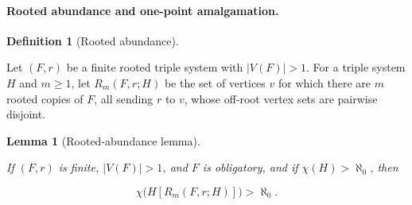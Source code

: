 \documentclass[a4paper,11pt,reqno]{amsart}
\theoremstyle{plain}
\newtheorem{lemma}[theorem]{Lemma}
\theoremstyle{definition}
\newtheorem{definition}[theorem]{Definition}
\theoremstyle{remark}
\begin{document}
\paragraph{Rooted abundance and one-point amalgamation.}\label{rooted-abundance-and-one-point-amalgamation}

\begin{definition}[Rooted abundance]\label{definition-4.2-rooted-abundance}

Let \((F,r)\) be a finite rooted triple system with \(|V(F)|>1\). For a triple system \(H\) and \(m\ge1\), let \(R_m(F,r;H)\) be the set of vertices \(v\) for which there are \(m\) rooted copies of \(F\), all sending \(r\) to \(v\), whose off-root vertex sets are pairwise disjoint.

\end{definition}
\begin{lemma}[Rooted-abundance lemma]\label{lemma-4.3-rooted-abundance-lemma}

If \((F,r)\) is finite, \(|V(F)|>1\), and \(F\) is obligatory, and if
\(\chi(H)>\aleph_0\), then

\[
\chi\bigl(H[R_m(F,r;H)]\bigr)>\aleph_0.
\]

\end{lemma}
\end{document}
